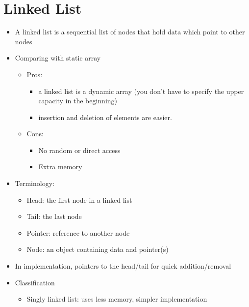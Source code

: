 \section{Linked List}
\begin{itemize}
	\item A linked list is a sequential list of nodes that hold data which point to other nodes
	\item Comparing with static array
	\begin{itemize}
		\item Pros:
		\begin{itemize}
			\item a linked list is a dynamic array (you don't have to specify the upper capacity in the beginning)
			\item insertion and deletion of elements are easier.
		\end{itemize}
		\item Cons:
		\begin{itemize}
			\item No random or direct access
			\item Extra memory
		\end{itemize}
	\end{itemize}
	\item Terminology:
	\begin{itemize}
		\item Head: the first node in a linked list
		\item Tail: the last node
		\item Pointer: reference to another node
		\item Node: an object containing data and pointer(s)
	\end{itemize}
	\item In implementation,  pointers to the head/tail for quick addition/removal
	\item Classification
	\begin{itemize}
		\item Singly linked list: uses less memory, simpler implementation\\

\end{itemize}
\end{itemize}
